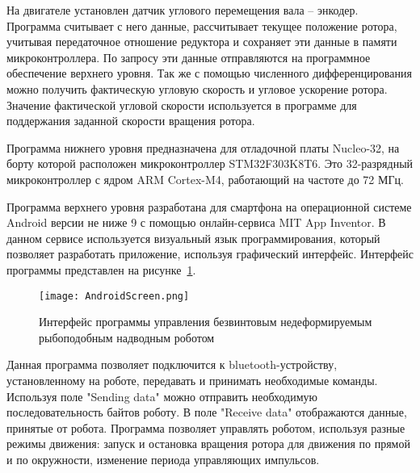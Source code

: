 На двигателе установлен датчик углового перемещения вала – энкодер. Программа считывает с него данные, рассчитывает текущее положение ротора, учитывая передаточное отношение редуктора и сохраняет эти данные в памяти микроконтроллера. По запросу эти данные отправляются на программное обеспечение верхнего уровня. Так же с помощью численного дифференцирования можно получить фактическую угловую скорость и угловое ускорение ротора. Значение фактической угловой скорости используется в программе для поддержания заданной скорости вращения ротора.

Программа нижнего уровня предназначена для отладочной платы Nucleo-32, на борту которой расположен микроконтроллер STM32F303K8T6. Это 32-разрядный микроконтроллер с ядром ARM Cortex-M4, работающий на частоте до 72 МГц.

Программа верхнего уровня разработана для смартфона на операционной системе Android версии не ниже 9 с помощью онлайн-сервиса MIT App Inventor. В данном сервисе используется визуальный язык программирования, который позволяет разработать приложение, используя графический интерфейс. Интерфейс программы представлен на рисунке~\ref{AndroidScreen}.



\begin{figure}[!h]
	\centering
	\texttt{[image: AndroidScreen.png]}
	\caption{Интерфейс программы управления безвинтовым недеформируемым рыбоподобным надводным роботом}
	\label{AndroidScreen}
\end{figure}

Данная программа позволяет подключится к bluetooth-устройству, установленному на роботе, передавать и принимать необходимые команды. Используя поле "Sending data" можно отправить необходимую последовательность байтов роботу. В поле "Receive data" отображаются данные, принятые от робота. Программа позволяет управлять роботом, используя разные режимы движения: запуск и остановка вращения ротора для движения по прямой и по окружности, изменение периода управляющих импульсов.


